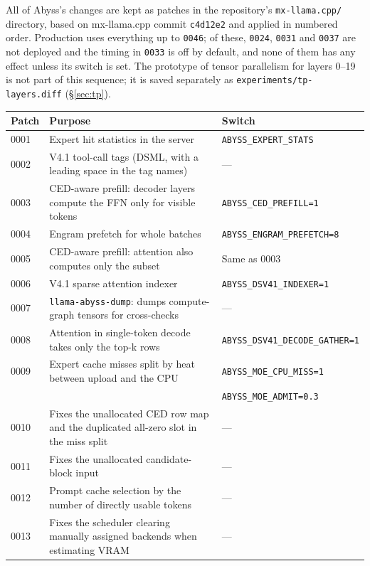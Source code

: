 \documentclass[11pt,a4paper]{article}
\newcommand{\code}[1]{\texttt{#1}}
\begin{document}
All of Abyss's changes are kept as patches in the repository's \code{mx-llama.cpp/} directory, based on mx-llama.cpp commit \code{c4d12e2} and applied in numbered order. Production uses everything up to \code{0046}; of these, \code{0024}, \code{0031} and \code{0037} are not deployed and the timing in \code{0033} is off by default, and none of them has any effect unless its switch is set. The prototype of tensor parallelism for layers 0--19 is not part of this sequence; it is saved separately as \code{experiments/tp-layers.diff} (\S\ref{sec:tp}).

\begin{table}[h]
  \centering
  \small
  \begin{tabularx}{\textwidth}{@{}l X l@{}}
    \toprule
    Patch & Purpose & Switch \\
    \midrule
    0001 & Expert hit statistics in the server & \code{ABYSS\_EXPERT\_STATS} \\
    0002 & V4.1 tool-call tags (DSML, with a leading space in the tag names) & --- \\
    0003 & CED-aware prefill: decoder layers compute the FFN only for visible tokens & \code{ABYSS\_CED\_PREFILL=1} \\
    0004 & Engram prefetch for whole batches & \code{ABYSS\_ENGRAM\_PREFETCH=8} \\
    0005 & CED-aware prefill: attention also computes only the subset & Same as 0003 \\
    0006 & V4.1 sparse attention indexer & \code{ABYSS\_DSV41\_INDEXER=1} \\
    0007 & \code{llama-abyss-dump}: dumps compute-graph tensors for cross-checks & --- \\
    0008 & Attention in single-token decode takes only the top-k rows & \code{ABYSS\_DSV41\_DECODE\_GATHER=1} \\
    0009 & Expert cache misses split by heat between upload and the CPU & \code{ABYSS\_MOE\_CPU\_MISS=1} \\
         & & \code{ABYSS\_MOE\_ADMIT=0.3} \\
    0010 & Fixes the unallocated CED row map and the duplicated all-zero slot in the miss split & --- \\
    0011 & Fixes the unallocated candidate-block input & --- \\
    0012 & Prompt cache selection by the number of directly usable tokens & --- \\
    0013 & Fixes the scheduler clearing manually assigned backends when estimating VRAM & --- \\

\end{tabularx}
\end{table}
\end{document}
